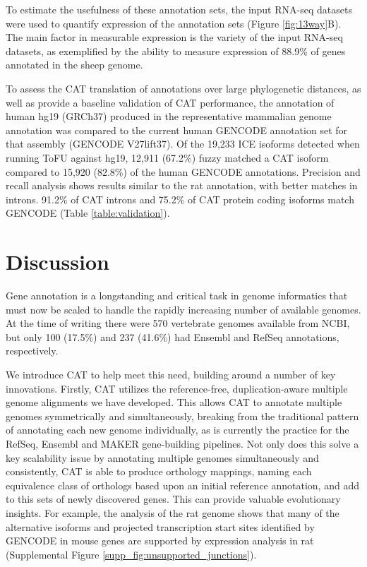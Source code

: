 \documentclass[fleqn,10pt]{wlscirep}
\begin{document}
To estimate the usefulness of these annotation sets, the input RNA-seq datasets were used to quantify expression of the annotation sets (Figure \ref{fig:13way}B). The main factor in measurable expression is the variety of the input RNA-seq datasets, as exemplified by the ability to measure expression of 88.9\% of genes annotated in the sheep genome. 

To assess the CAT translation of annotations over large phylogenetic distances, as well as provide a baseline validation of CAT performance, the annotation of human hg19 (GRCh37) produced in the representative mammalian genome annotation was compared to the current human GENCODE annotation set for that assembly (GENCODE V27lift37). Of the 19,233 ICE isoforms detected when running ToFU  \citep{gordon2015widespread} against hg19, 12,911 (67.2\%) fuzzy matched a CAT isoform compared to 15,920 (82.8\%) of the human GENCODE annotations. Precision and recall analysis shows results similar to the rat annotation, with better matches in introns. 91.2\% of CAT introns and 75.2\% of CAT protein coding isoforms match GENCODE (Table \ref{table:validation}).

\section*{Discussion}

Gene annotation is a longstanding and critical task in genome informatics that must now be scaled to handle the rapidly increasing number of available genomes. At the time of writing there were 570 vertebrate genomes available from NCBI, but only 100 (17.5\%) and 237 (41.6\%) had Ensembl and RefSeq annotations, respectively.

We introduce CAT to help meet this need, building around a number of key innovations. 
Firstly, CAT utilizes the reference-free, duplication-aware multiple genome alignments we have developed. This allows CAT to annotate multiple genomes symmetrically and simultaneously, breaking from the traditional pattern of annotating each new genome individually, as is currently the practice for the RefSeq, Ensembl and MAKER gene-building pipelines.
Not only does this solve a key scalability issue 
by annotating multiple genomes simultaneously and consistently, CAT is able to produce orthology mappings, naming each equivalence class of orthologs based upon an initial reference annotation, and add to this sets of newly discovered genes. This can provide valuable evolutionary insights. For example, the analysis of the rat genome shows that many of the alternative isoforms and projected transcription start sites identified by GENCODE in mouse genes are supported by expression analysis in rat (Supplemental Figure \ref{supp_fig:unsupported_junctions}).
\end{document}
